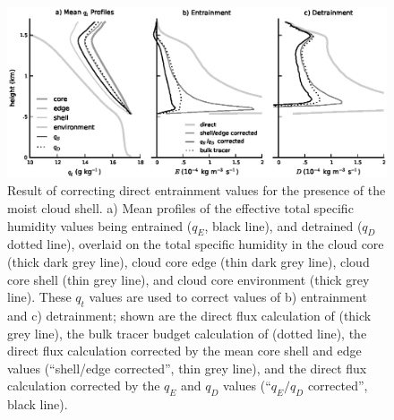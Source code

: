 \documentclass[draft,grl]{agutex}
\begin{document}
\begin{article}







%
%

\end{article}




\begin{figure}
  \noindent\includegraphics[width=39pc]{./figures/reynolds_correction}
  \caption{Result of correcting direct entrainment values for the presence of 
  the moist cloud shell.  a) Mean profiles of the effective total specific 
  humidity values being entrained ($q_E$, black line), and detrained ($q_D$ dotted 
  line), overlaid on the total specific humidity in the cloud core (thick dark 
  grey line), cloud core edge (thin dark grey line), cloud core shell (thin 
  grey line), and cloud core environment (thick grey line).  These $q_t$ values 
  are used to correct values of b) entrainment and c) detrainment; shown are the 
  direct flux calculation of \cite{Romps2010} (thick grey line), the bulk 
  tracer budget calculation of \cite{Siebesma1995} (dotted line), the direct 
  flux calculation corrected by the mean core shell and edge values (``shell/edge corrected'', thin grey 
  line), and the direct flux calculation corrected by the $q_E$ and $q_D$ 
  values (``$q_E/q_D$ corrected'', black line).}
  \label{fig:Reynolds_correction}
\end{figure}
\end{document}
